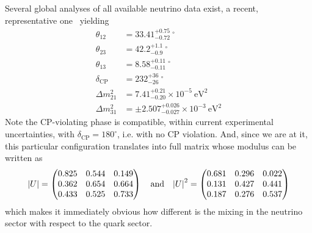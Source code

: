 Several global analyses of all available neutrino data exist, a recent, representative
one~\cite{2020JHEP...09..178E} yielding
\begin{align}
  \theta_{12} & = 33.41^{+0.75}_{-0.72}~^\circ \nonumber\\
  \theta_{23} & = 42.2^{+1.1}_{-0.9}~^\circ \nonumber\\
  \theta_{13} & = 8.58^{+0.11}_{-0.11}~^\circ \nonumber\\
  \delta_\text{CP} & = 232^{+36}_{-26}~^\circ \nonumber\\
  \Delta m^2_{21} & = 7.41^{+0.21}_{-0.20} \times 10^{-5}~\text{eV}^2 \nonumber\\
  \Delta m^2_{31} & = \pm 2.507^{+0.026}_{-0.027} \times 10^{-3}~\text{eV}^2
\end{align}
Note the CP-violating phase is compatible, within current experimental uncertainties,
with $\delta_\text{CP} = 180^\circ$, i.e. with no CP violation. And, since we are at it,
this particular configuration translates into full matrix whose modulus can be written as
\begin{align*}
  \abs{U} =
  \begin{pmatrix}
    0.825 & 0.544 & 0.149\\
    0.362 & 0.654 & 0.664\\
    0.433 & 0.525 & 0.733\\
  \end{pmatrix}
  \quad\text{and}\quad
  \abs{U}^2 =
  \begin{pmatrix}
    0.681 & 0.296 & 0.022\\
    0.131 & 0.427 & 0.441\\
    0.187 & 0.276 & 0.537\\
  \end{pmatrix}
\end{align*}
which makes it immediately obvious how different is the mixing in the neutrino
sector with respect to the quark sector.

